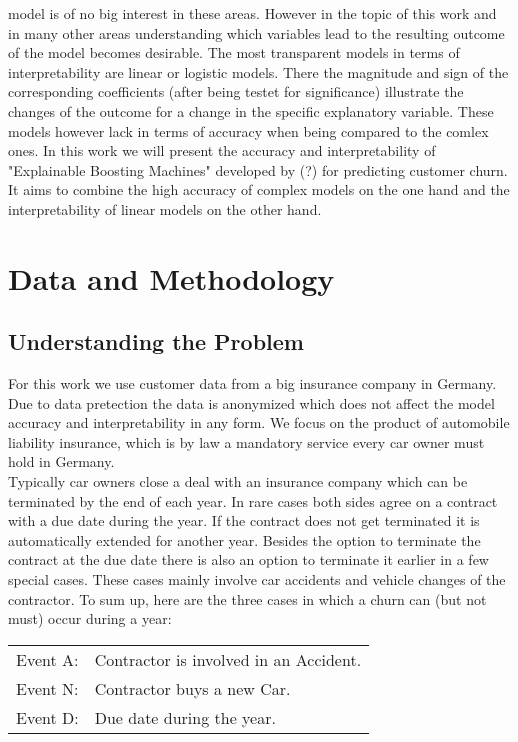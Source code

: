\documentclass[12pt,titlepage]{article}
\begin{document}
model is of no big interest in these areas. However in the topic of this work and in many other areas understanding which
variables lead to the resulting outcome of the model becomes desirable. The most transparent models in terms of
interpretability are linear or logistic models. There the magnitude and sign of the corresponding coefficients (after being
testet for significance) illustrate the changes of the outcome for a change in the specific explanatory variable. These models
however lack in terms of accuracy when being compared to the comlex ones. In this work we will present the accuracy and
interpretability of "Explainable Boosting Machines" developed by (?) for predicting customer churn. It aims to combine the
high accuracy of complex models on the one hand and the interpretability of linear models on the other hand. \\

\section{Data and Methodology} \par

\subsection{Understanding the Problem} \par

For this work we use customer data from a big insurance company in Germany. Due to data pretection the data is anonymized which
does not affect the model accuracy and interpretability in any form. We focus on the product of automobile liability insurance,
which is by law a mandatory service every car owner must hold in Germany. \\
Typically car owners close a deal with an insurance company which can be terminated by the end of each year. In rare cases both
sides agree on a contract with a due date during the year. If the contract does not get terminated it is automatically extended
for another year. Besides the option to terminate the contract at the due date there is also an option to terminate
it earlier in a few special cases. These cases mainly involve car accidents and vehicle changes of the contractor. To sum up,
here are the three cases in which a churn can (but not must) occur during a year: \\

\begin{center}
    \begin{tabular}{ll}
        Event A: & Contractor is involved in an Accident. \\
        Event N: & Contractor buys a new Car. \\
        Event D: & Due date during the year. \\
    \end{tabular}
\end{center}
\end{document}
